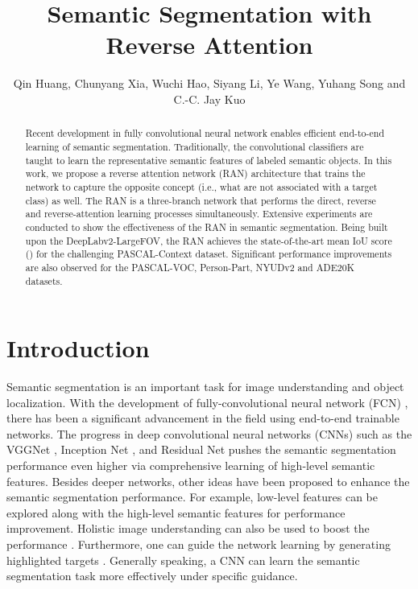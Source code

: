 \documentclass[runningheads]{llncs}
\begin{document}
\pagestyle{headings}
\mainmatter



\title{Semantic Segmentation with Reverse Attention} 

\author{Qin Huang, Chunyang Xia, Wuchi Hao, Siyang Li, Ye Wang, Yuhang Song and C.-C. Jay Kuo}

\maketitle





\begin{abstract}
Recent development in fully convolutional neural network enables efficient end-to-end learning of
semantic segmentation. Traditionally,  the convolutional classifiers are taught to learn the representative semantic features
of labeled semantic objects.  In this work, we
propose a reverse attention network (RAN) architecture that trains the
network to capture the opposite concept (i.e., what are not associated
with a target class) as well. The RAN is a three-branch network that
performs the direct, reverse and reverse-attention learning processes
simultaneously.  Extensive experiments are conducted to show the
effectiveness of the RAN in semantic segmentation.  Being built upon the
DeepLabv2-LargeFOV, the RAN achieves the state-of-the-art mean IoU score
() for the challenging PASCAL-Context dataset.  Significant
performance improvements are also observed for the PASCAL-VOC, Person-Part, NYUDv2 and ADE20K datasets. 
\end{abstract}

\section{Introduction}\label{sec:intro}

Semantic segmentation is an important task for image understanding and
object localization.  With the development of fully-convolutional neural
network (FCN) \cite{long2015fully}, there has been a significant
advancement in the field using end-to-end trainable networks.  The
progress in deep convolutional neural networks (CNNs) such as the VGGNet
\cite{simonyan2014very}, Inception Net \cite{szegedy2015going}, and
Residual Net \cite{he2015deep} pushes the semantic segmentation
performance even higher via comprehensive learning of high-level
semantic features.  Besides deeper networks, other ideas have been
proposed to enhance the semantic segmentation performance. For example,
low-level features can be explored along with the high-level semantic
features \cite{bishop2006pattern} for performance
improvement.  Holistic image understanding can also be used to boost the
performance \cite{lin2016refinenet,zhao2016pyramid,hu2016recalling}.
Furthermore, one can guide the network learning by generating
highlighted targets \cite{doersch2015unsupervised, dai2016instance, dai2016r,shrivastava2016training,wu2016high,wu2016bridging}. Generally
speaking, a CNN can learn the semantic segmentation task more
effectively under specific guidance. 
\end{document}
